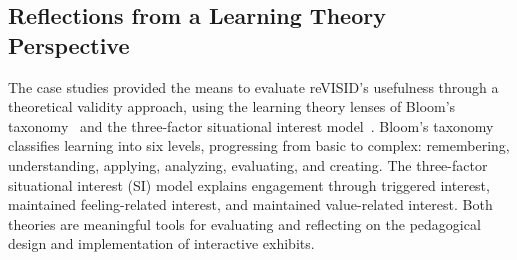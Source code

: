 \documentclass[preprint,journal]{vgtc}            %
\begin{document}

\subsection{Reflections from a Learning Theory Perspective}

The case studies provided the means to evaluate reVISID's usefulness through a theoretical validity approach, using the learning theory lenses of Bloom's taxonomy~\cite{Bloom56Taxonomy} and the three-factor situational interest model~\cite{Lisa10Measuring}.
 Bloom's taxonomy classifies learning into six levels, progressing from basic to complex: remembering, understanding, applying, analyzing, evaluating, and creating. 
The three-factor situational interest (SI) model explains engagement through triggered interest, maintained feeling-related interest, and maintained value-related interest.
Both theories are meaningful tools for evaluating and reflecting on the pedagogical design and implementation of interactive exhibits.
\end{document}
